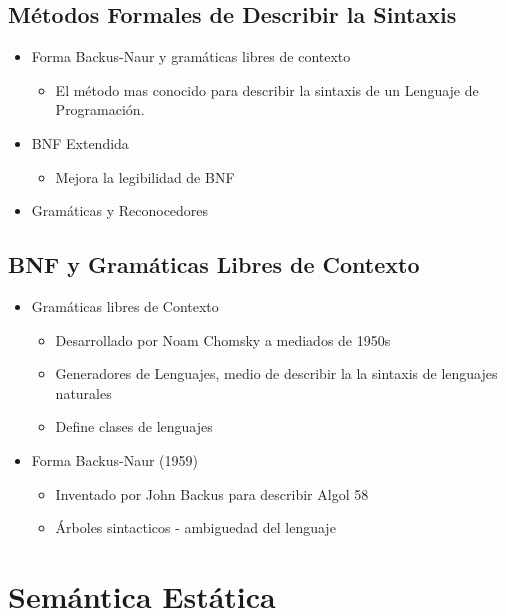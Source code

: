 \documentclass[11pt]{article}
\begin{document}
\subsection*{Métodos Formales de Describir la Sintaxis}
\label{sec:org1f3ca6d}
\begin{itemize}
\item Forma Backus-Naur y gramáticas libres de contexto
\begin{itemize}
\item El método mas conocido para describir la sintaxis de un Lenguaje
de Programación.
\end{itemize}
\item BNF Extendida
\begin{itemize}
\item Mejora la legibilidad de BNF
\end{itemize}
\item Gramáticas y Reconocedores
\end{itemize}

\subsection*{BNF y Gramáticas Libres de Contexto}
\label{sec:org930b9ea}
\begin{itemize}
\item Gramáticas libres de Contexto
\begin{itemize}
\item Desarrollado por Noam Chomsky a mediados de 1950s
\item Generadores de Lenguajes, medio de  describir la la sintaxis de
lenguajes naturales
\item Define clases de lenguajes
\end{itemize}
\item Forma Backus-Naur (1959)
\begin{itemize}
\item Inventado por John Backus para describir Algol 58
\item Árboles sintacticos - ambiguedad del lenguaje
\end{itemize}
\end{itemize}

\section*{Semántica Estática}
\label{sec:org2bcef72}
\end{document}
